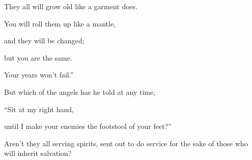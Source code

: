 {\par }{\QB They all will grow old like a garment does.
\par }{\Q {}You will roll them up like a mantle,
\par }{\QB and they will be changed;
\par }{\QB but you are the same.
\par }{\QB Your years won’t fail.”
\par }{\PP {}But which of the angels has he told at any time,
\par }{\Q “Sit at my right hand,
\par }{\QB until I make your enemies the footstool of your feet?”
\par }{\PP {}Aren’t they all serving spirits, sent out to do service for the sake of those who will inherit salvation?

}
